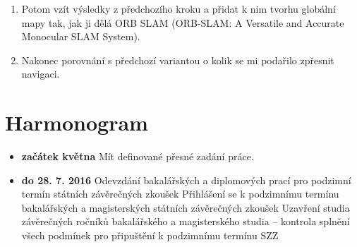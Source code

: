 \begin{enumerate}
\item Potom vzít výsledky z předchozího kroku a přidat k nim tvorhu globální mapy tak, jak ji dělá ORB SLAM (ORB-SLAM: A Versatile and Accurate Monocular SLAM System). 

\item Nakonec porovnání s předchozí variantou o kolik se mi podařilo zpřesnit navigaci.
\end{enumerate}

\section{Harmonogram}

\begin{itemize}
\item \textbf{začátek května} Mít definované přesné zadání práce.
\item \textbf{do 28. 7. 2016} Odevzdání bakalářských a diplomových prací pro podzimní termín státních závěrečných zkoušek 
Přihlášení se k podzimnímu termínu bakalářských a magisterských státních závěrečných zkoušek 
Uzavření studia závěrečných ročníků bakalářského a magisterského studia – kontrola splnění všech podmínek pro připuštění k podzimnímu termínu SZZ 
\end{itemize}



